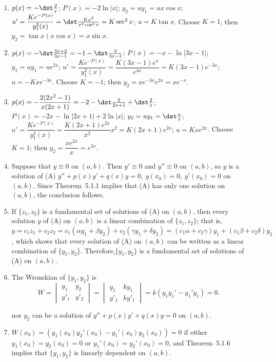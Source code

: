 \documentclass[openany]{book}
\newenvironment{sectionSolutions}{
 \begin{enumerate}[item-label={\thesection.\arabic{enumi}.}]
}{
 \end{enumerate}
}
\begin{document}
\begin{sectionSolutions}
\item
$p(x)=-\dst\frac{2}{ x}$;\;
$P(x)=-2\ln|x|$;\;
$y_2=uy_1=ux\cos x$;\;
$u'=\dfrac{Ke^{-P(x)}}{ y_1^2(x)}=\dst\frac{Kx^2}{ x^2\cos^2
x}=K\sec^2x$;\;
$u=K\tan x$.
Choose $K=1$; then
$y_2=\tan x(x\cos x)=x\sin x$.

\item
$p(x)=-\dst\frac{3x+2}{3x-1}=-1-\dst\frac{3}{3x-1}$;\;
$P(x)=-x-\ln|3x-1|$;\;
$y_2=uy_1=ue^{2x}$;\;
$u'=\dfrac{Ke^{-P(x)}}{ y_1^2(x)}=\dfrac{K(3x-1)e^x}{
e^{4x}}=K(3x-1)e^{-3x}$;\;
$u=-Kxe^{-3x}$.
Choose $K=-1$; then
$y_2=xe^{-3x}e^{2x}=xe^{-x}$.


\item
$p(x)=-\dfrac{2(2x^2-1)}{
x(2x+1)}=-2-\dst\frac{2}{2x+1}+\dst\frac{2}{ x}$;\;
$P(x)=-2x-\ln|2x+1|+2\ln|x|$;\;
$y_2=uy_1=\dst\frac{u}{ x}$;\;
$u'=\dfrac{Ke^{-P(x)}}{ y_1^2(x)}=\dfrac{K(2x+1)e^{2x}}{
x^2}x^2=K(2x+1)e^{2x}$;\;
$u=Kxe^{2x}$.
Choose $K=1$; then
$y_2=\dfrac{xe^{2x}}{ x}=e^{2x}$.


\item
Suppose that $y\equiv0$ on $(a,b)$. Then $y'\equiv0$ and $y''\equiv0$
on $(a,b)$, so $y$ is a solution of (A) $y''+p(x)y'+q(x)y=0,\
y(x_0)=0,\ y'(x_0)=0$ on $(a,b)$. Since Theorem~5.1.1
implies that (A) has only one solution on $(a,b)$, the conclusion
follows.


\item
If $\{z_1,z_2\}$ is a fundamental set of solutions of
(A) on $(a,b)$, then every solution $y$ of
(A) on $(a,b)$ is a linear combination of
$\{z_1,z_2\}$; that is, $y=c_1z_1+c_2z_2=c_1(\alpha y_1+\beta
y_2)+c_2(\gamma y_1+\delta y_2)
=(c_1\alpha+c_2\gamma)y_1+(c_1\beta+c_2\delta)y_2$, which shows that
every solution of (A) on $(a,b)$ can be written as
a linear combination of $\{y_1,y_2\}$. Therefore,$\{y_1,y_2\}$ is a
fundamental set of solutions of (A) on $(a,b)$.


\item
The Wronskian of  $\{y_1,y_2\}$ is
\[
W=\begin{vmatrix}
y_1 & y_2 \\
y'_1 & y'_2
\end{vmatrix}=
\begin{vmatrix}
y_1 & ky_1 \\
y'_1 & ky'_1
\end{vmatrix}=k(y_1y_1'-y_1'y_1)=0.
\]

nor $y_2$ can be a solution of $y''+p(x)y'+q(x)y=0$ on  $(a,b)$.

\item
$W(x_0)=\left(y_1(x_0)y_2'(x_0)-y_1'(x_0)y_2(x_0)\right)=0$
if either $y_1(x_0)=y_2(x_0)=0$ or
$y_1'(x_0)=y_2'(x_0)=0$, and  Theorem~5.1.6
implies that  $\{y_1,y_2\}$ is linearly dependent on  $(a,b)$.



\end{sectionSolutions}
\end{document}
